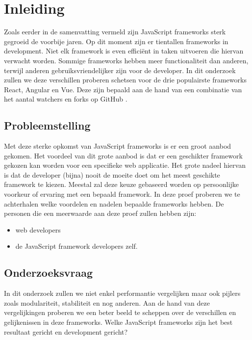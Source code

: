 
\chapter{Inleiding}
\label{ch:inleiding}

Zoals eerder in de samenvatting vermeld zijn JavaScript frameworks sterk gegroeid de voorbije jaren. Op dit moment zijn er tientallen frameworks in development. Niet elk framework is even efficiënt in taken uitvoeren die hiervan verwacht worden. Sommige frameworks hebben meer functionaliteit dan anderen, terwijl anderen gebruiksvriendelijker zijn voor de developer. In dit onderzoek zullen we deze verschillen proberen schetsen voor de drie populairste frameworks React, Angular en Vue. Deze zijn bepaald aan de hand van een combinatie van het aantal watchers en forks op GitHub \autocite{github_front-end_????}.

\section{Probleemstelling}
\label{sec:probleemstelling}

Met deze sterke opkomst van JavaScript frameworks is er een groot aanbod gekomen. Het voordeel van dit grote aanbod is dat er een geschikter framework gekozen kan worden voor een specifieke web applicatie. Het grote nadeel hiervan is dat de developer (bijna) nooit de moeite doet om het meest geschikte framework te kiezen. Meestal zal deze keuze gebaseerd worden op persoonlijke voorkeur of ervaring met een bepaald framework. In deze proef proberen we te achterhalen welke voordelen en nadelen bepaalde frameworks hebben. De personen die een meerwaarde aan deze proef zullen hebben zijn:

\begin{itemize}
	\item web developers
	\item de JavaScript framework developers zelf.
\end{itemize}

\section{Onderzoeksvraag}
\label{sec:onderzoeksvraag}

In dit onderzoek zullen we niet enkel performantie vergelijken maar ook pijlers zoals modulariteit, stabiliteit en nog anderen. Aan de hand van deze vergelijkingen proberen we een beter beeld te scheppen over de verschillen en gelijkenissen in deze frameworks. Welke JavaScript frameworks zijn het best resultaat gericht en development gericht?

